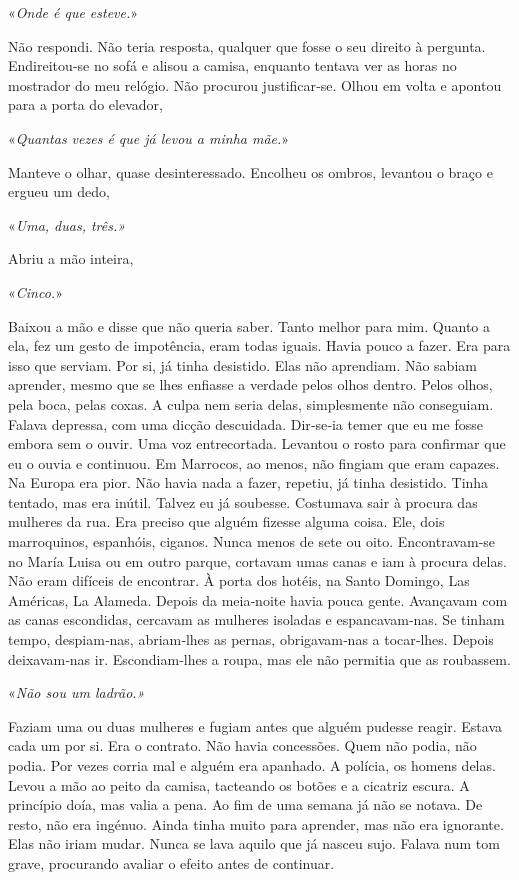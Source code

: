 «\emph{Onde é que esteve.}»

Não respondi. Não teria resposta, qualquer que fosse o seu direito à
pergunta. Endireitou­‑se no sofá e alisou a camisa, enquanto tentava ver
as horas no mostrador do meu relógio. Não procurou justificar­‑se. Olhou
em volta e apontou para a porta do elevador,

«\emph{Quantas vezes é que já levou a minha mãe.}»

Manteve o olhar, quase desinteressado. Encolheu os ombros, levantou o
braço e ergueu um dedo,

«\emph{Uma, duas, três.»}

Abriu a mão inteira,

«\emph{Cinco.}»

Baixou a mão e disse que não queria saber. Tanto melhor para mim. Quanto
a ela, fez um gesto de impotência, eram todas iguais. Havia pouco a
fazer. Era para isso que serviam. Por si, já tinha desistido. Elas não
aprendiam. Não sabiam aprender, mesmo que se lhes enfiasse a verdade
pelos olhos dentro. Pelos olhos, pela boca, pelas coxas. A culpa nem
seria delas, simplesmente não conseguiam. Falava depressa, com uma
dicção descuidada. Dir­‑se­‑ia temer que eu me fosse embora sem o ouvir.
Uma voz entrecortada. Levantou o rosto para confirmar que eu o ouvia e
continuou. Em Marrocos, ao menos, não fingiam que eram capazes. Na
Europa era pior. Não havia nada a fazer, repetiu, já tinha desistido.
Tinha tentado, mas era inútil. Talvez eu já soubesse. Costumava sair à
procura das mulheres da rua. Era preciso que alguém fizesse alguma
coisa. Ele, dois marroquinos, espanhóis, ciganos. Nunca menos de sete ou
oito. Encontravam­‑se no María Luisa ou em outro parque, cortavam umas
canas e iam à procura delas. Não eram difíceis de encontrar. À porta dos
hotéis, na Santo Domingo, Las Américas, La Alameda. Depois da
meia­‑noite havia pouca gente. Avançavam com as canas escondidas,
cercavam as mulheres isoladas e espancavam­‑nas. Se tinham tempo,
despiam­‑nas, abriam­‑lhes as pernas, obrigavam­‑nas a tocar­‑lhes.
Depois deixavam­‑nas ir. Escondiam­‑lhes a roupa, mas ele não permitia
que as roubassem.

«\emph{Não sou um ladrão.»}

Faziam uma ou duas mulheres e fugiam antes que alguém pudesse reagir.
Estava cada um por si. Era o contrato. Não havia concessões. Quem não
podia, não podia. Por vezes corria mal e alguém era apanhado. A polícia,
os homens delas. Levou a mão ao peito da camisa, tacteando os botões e a
cicatriz escura. A princípio doía, mas valia a pena. Ao fim de uma
semana já não se notava. De resto, não era ingénuo. Ainda tinha muito
para aprender, mas não era ignorante. Elas não iriam mudar. Nunca se
lava aquilo que já nasceu sujo. Falava num tom grave, procurando avaliar
o efeito antes de continuar.

